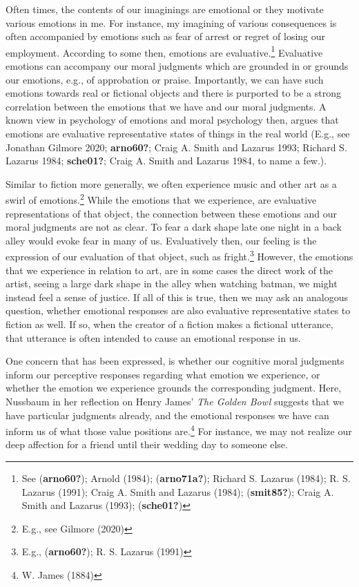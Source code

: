 \documentclass[12pt]{book}
\theoremstyle{definition}
\theoremstyle{remark}
\begin{document}
Often times, the contents of our imaginings are emotional or they motivate various emotions in me. For instance, my imagining of various consequences is often accompanied by emotions such as fear of arrest or regret of losing our employment. According to some then, emotions are evaluative.\footnote{See (\textbf{arno60?}); Arnold (1984); (\textbf{arno71a?}); Richard S. Lazarus (1984); R. S. Lazarus (1991); Craig A. Smith and Lazarus (1984); (\textbf{smit85?}); Craig A. Smith and Lazarus (1993); (\textbf{sche01?})} Evaluative emotions can accompany our moral judgments which are grounded in or grounds our emotions, e.g., of approbation or praise. Importantly, we can have such emotions towards real or fictional objects and there is purported to be a strong correlation between the emotions that we have and our moral judgments. A known view in psychology of emotions and moral psychology then, argues that emotions are evaluative representative states of things in the real world (E.g., see Jonathan Gilmore 2020; \textbf{arno60?}; Craig A. Smith and Lazarus 1993; Richard S. Lazarus 1984; \textbf{sche01?}; Craig A. Smith and Lazarus 1984, to name a few.).

Similar to fiction more generally, we often experience music and other art as a swirl of emotions.\footnote{E.g., see Gilmore (2020)} While the emotions that we experience, are evaluative representations of that object, the connection between these emotions and our moral judgments are not as clear. To fear a dark shape late one night in a back alley would evoke fear in many of us. Evaluatively then, our feeling is the expression of our evaluation of that object, such as fright.\footnote{E.g., (\textbf{arno60?}); R. S. Lazarus (1991)} However, the emotions that we experience in relation to art, are in some cases the direct work of the artist, seeing a large dark shape in the alley when watching batman, we might instead feel a sense of justice. If all of this is true, then we may ask an analogous question, whether emotional responses are also evaluative representative states to fiction as well. If so, when the creator of a fiction makes a fictional utterance, that utterance is often intended to cause an emotional response in us.

One concern that has been expressed, is whether our cognitive moral judgments inform our perceptive responses regarding what emotion we experience, or whether the emotion we experience grounds the corresponding judgment. Here, Nussbaum in her reflection on Henry James' \emph{The Golden Bowl} suggests that we have particular judgments already, and the emotional responses we have can inform us of what those value positions are.\footnote{W. James (1884)} For instance, we may not realize our deep affection for a friend until their wedding day to someone else.
\end{document}

